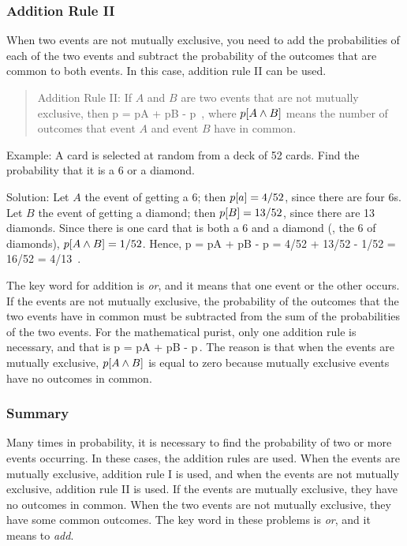 \subsubsection{Addition Rule II}
When two events are not mutually exclusive, you need to add the probabilities of each of the two events and subtract the probability of the outcomes that are common to both events. In this case, addition rule II can be used.

\begin{quote}
Addition Rule II: If $A$ and $B$ are two events that are not mutually exclusive, then 
\beq
p = p\vat A + p\vat B - p \,,
\eeq
where $p\!\left[{A\land B}\right]$ means the number of outcomes that event $A$ and event $B$ have in common.
\end{quote}

Example: A card is selected at random from a deck of 52 cards. Find the probability that it is a 6 or a diamond.

Solution: Let $A$ the event of getting a 6; then $p\!\left[{a}\right] = 4/52$, since there are four 6s. Let $B$ the event of getting a diamond; then $p\!\left[{B}\right] = 13/52$, since there are 13 diamonds. Since there is one card that is both a 6 and a diamond (\ie, the 6 of diamonds), $p\!\left[{A\land B}\right] = 1/52$. Hence,
\beq
p = p\vat A + p\vat B - p = 4/52 + 13/52 - 1/52 = 16/52 = 4/13 \,.
\eeq

The key word for addition is \emph{or}, and it means that one event or the other occurs. If the events are not mutually exclusive, the probability of the outcomes that the two events have in common must be subtracted from the sum of the probabilities of the two events. For the mathematical purist, only one addition rule is necessary, and that is
\beq
p = p\vat A + p\vat B - p\,.
\eeq
The reason is that when the events are mutually exclusive, $p\!\left[{A\land B}\right]$ is equal to zero because mutually exclusive events have no outcomes in common.

\subsubsection{Summary}
Many times in probability, it is necessary to find the probability of two or more events occurring. In these cases, the addition rules are used. When the events are mutually exclusive, addition rule I is used, and when the events are not mutually exclusive, addition rule II is used. If the events are mutually exclusive, they have no outcomes in common. When the two events are not mutually exclusive, they have some common outcomes. The key word in these problems is \emph{or}, and it means to \emph{add}.


